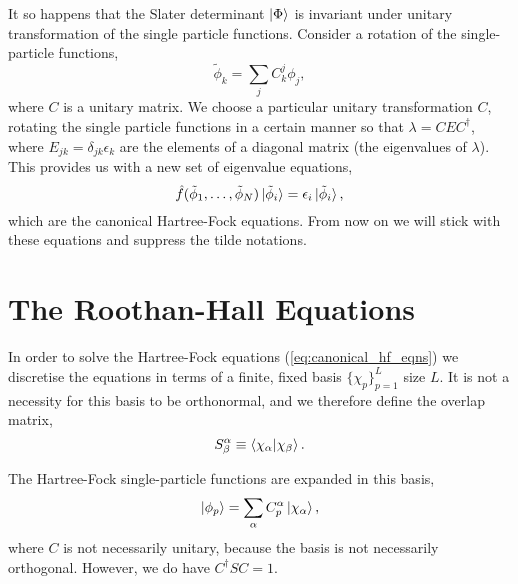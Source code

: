 It so happens that the Slater determinant $\ket{\Phi}$ is invariant under unitary
transformation of the single particle functions. Consider a rotation of the 
single-particle functions,
\begin{equation}
    \tilde{\phi}_k = \sum_j C^j_k\phi_j ,
\end{equation}
where $C$ is a unitary matrix.
We choose a particular
unitary transformation $C$, rotating the single particle functions in a certain 
manner so that $\lambda = CEC^\dagger$, where $E_{jk} = \delta_{jk}\epsilon_k$ are the 
elements of a diagonal matrix (the eigenvalues of $\lambda$). This provides us with 
a new set of eigenvalue equations,
\begin{equation}
    \label{eq:canonical_hf_eqns}
    \hat{f}(\tilde{\phi}_1, \dots, \tilde{\phi}_N)\ket*{\tilde{\phi}_i}
        = \epsilon_i \ket*{\tilde{\phi}_i},
\end{equation}
which are the canonical Hartree-Fock equations. From now on we will stick with these 
equations and suppress the tilde notations.

\section{The Roothan-Hall Equations}
\label{sec:roothan_hall_eqns}

In order to solve the Hartree-Fock equations (\autoref{eq:canonical_hf_eqns}) we 
discretise the equations in terms of a finite, fixed basis $\{\chi_p \}_{p=1}^L$ 
size $L$. It is not a necessity for this basis to be orthonormal, and we therefore 
define the overlap matrix,
\begin{equation}
    S^\alpha_\beta \equiv \braket{\chi_\alpha}{\chi_\beta}.
\end{equation}

The Hartree-Fock single-particle functions are expanded in this basis,
\begin{equation}
    \label{eq:roothan_hall_exp}
    \ket{\phi_p} = \sum_\alpha C^\alpha_p \ket{\chi_\alpha},
\end{equation}
where $C$ is not necessarily unitary, because the basis is not necessarily 
orthogonal. However, we do have $C^\dagger SC = 1$.

